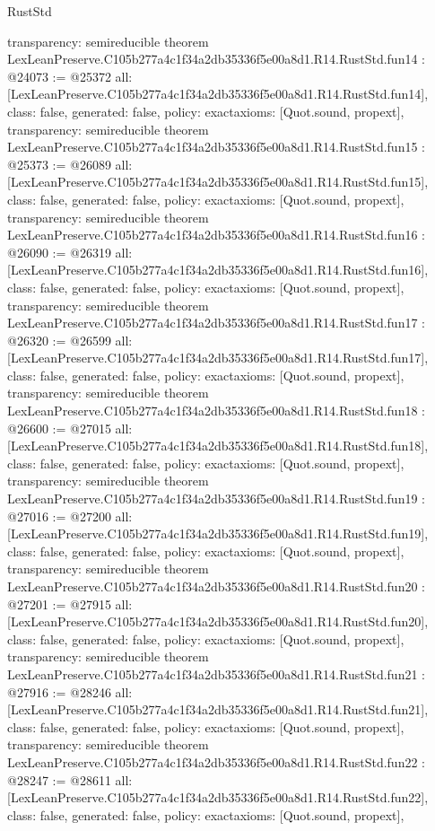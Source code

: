 \begin{lexlean}{RustStd}
\begin{coremodule}
{  transparency: semireducible
}
theorem LexLeanPreserve.C105b277a4c1f34a2db35336f5e00a8d1.R14.RustStd.fun14 : @24073 := @25372 {
  all: [LexLeanPreserve.C105b277a4c1f34a2db35336f5e00a8d1.R14.RustStd.fun14],
  class: false,
  generated: false,
  policy: exact{axioms: [Quot.sound, propext]},
  transparency: semireducible
}
theorem LexLeanPreserve.C105b277a4c1f34a2db35336f5e00a8d1.R14.RustStd.fun15 : @25373 := @26089 {
  all: [LexLeanPreserve.C105b277a4c1f34a2db35336f5e00a8d1.R14.RustStd.fun15],
  class: false,
  generated: false,
  policy: exact{axioms: [Quot.sound, propext]},
  transparency: semireducible
}
theorem LexLeanPreserve.C105b277a4c1f34a2db35336f5e00a8d1.R14.RustStd.fun16 : @26090 := @26319 {
  all: [LexLeanPreserve.C105b277a4c1f34a2db35336f5e00a8d1.R14.RustStd.fun16],
  class: false,
  generated: false,
  policy: exact{axioms: [Quot.sound, propext]},
  transparency: semireducible
}
theorem LexLeanPreserve.C105b277a4c1f34a2db35336f5e00a8d1.R14.RustStd.fun17 : @26320 := @26599 {
  all: [LexLeanPreserve.C105b277a4c1f34a2db35336f5e00a8d1.R14.RustStd.fun17],
  class: false,
  generated: false,
  policy: exact{axioms: [Quot.sound, propext]},
  transparency: semireducible
}
theorem LexLeanPreserve.C105b277a4c1f34a2db35336f5e00a8d1.R14.RustStd.fun18 : @26600 := @27015 {
  all: [LexLeanPreserve.C105b277a4c1f34a2db35336f5e00a8d1.R14.RustStd.fun18],
  class: false,
  generated: false,
  policy: exact{axioms: [Quot.sound, propext]},
  transparency: semireducible
}
theorem LexLeanPreserve.C105b277a4c1f34a2db35336f5e00a8d1.R14.RustStd.fun19 : @27016 := @27200 {
  all: [LexLeanPreserve.C105b277a4c1f34a2db35336f5e00a8d1.R14.RustStd.fun19],
  class: false,
  generated: false,
  policy: exact{axioms: [Quot.sound, propext]},
  transparency: semireducible
}
theorem LexLeanPreserve.C105b277a4c1f34a2db35336f5e00a8d1.R14.RustStd.fun20 : @27201 := @27915 {
  all: [LexLeanPreserve.C105b277a4c1f34a2db35336f5e00a8d1.R14.RustStd.fun20],
  class: false,
  generated: false,
  policy: exact{axioms: [Quot.sound, propext]},
  transparency: semireducible
}
theorem LexLeanPreserve.C105b277a4c1f34a2db35336f5e00a8d1.R14.RustStd.fun21 : @27916 := @28246 {
  all: [LexLeanPreserve.C105b277a4c1f34a2db35336f5e00a8d1.R14.RustStd.fun21],
  class: false,
  generated: false,
  policy: exact{axioms: [Quot.sound, propext]},
  transparency: semireducible
}
theorem LexLeanPreserve.C105b277a4c1f34a2db35336f5e00a8d1.R14.RustStd.fun22 : @28247 := @28611 {
  all: [LexLeanPreserve.C105b277a4c1f34a2db35336f5e00a8d1.R14.RustStd.fun22],
  class: false,
  generated: false,
  policy: exact{axioms: [Quot.sound, propext]},
}
\end{coremodule}
\end{lexlean}
